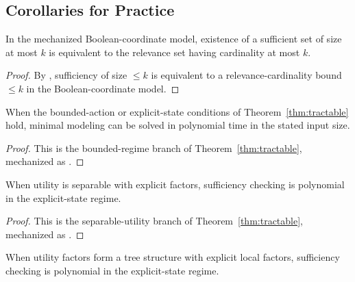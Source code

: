 \subsection{Corollaries for Practice}

\begin{corollary}\label{cor:practice-diagnostic}
In the mechanized Boolean-coordinate model, existence of a sufficient set of size at most $k$ is equivalent to the relevance set having cardinality at most $k$.
\end{corollary}

\begin{proof}
By , sufficiency of size $\le k$ is equivalent to a relevance-cardinality bound $\le k$ in the Boolean-coordinate model.
\end{proof}

\begin{corollary}\label{cor:practice-bounded}
When the bounded-action or explicit-state conditions of Theorem~\ref{thm:tractable} hold, minimal modeling can be solved in polynomial time in the stated input size.
\end{corollary}

\begin{proof}
This is the bounded-regime branch of Theorem~\ref{thm:tractable}, mechanized as .
\end{proof}

\begin{corollary}\label{cor:practice-structured}
When utility is separable with explicit factors, sufficiency checking is polynomial in the explicit-state regime.
\end{corollary}

\begin{proof}
This is the separable-utility branch of Theorem~\ref{thm:tractable}, mechanized as .
\end{proof}

\begin{corollary}\label{cor:practice-tree}
When utility factors form a tree structure with explicit local factors, sufficiency checking is polynomial in the explicit-state regime.
\end{corollary}

